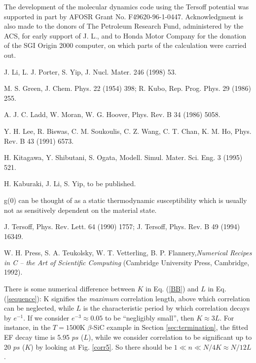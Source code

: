 \acknowledgments The development of the molecular dynamics code using
the Tersoff potential was supported in part by AFOSR Grant No.
F49620-96-1-0447.  Acknowledgment is also made to the donors of The
Petroleum Research Fund, administered by the ACS, for early support of
J. L., and to Honda Motor Company for the donation of the SGI Origin
2000 computer, on which parts of the calculation were carried out.

\begin{references}

 J. Li, L. J. Porter, S. Yip, J. Nucl. Mater. 246 (1998)
  53.

 M. S. Green, J. Chem. Phys. 22 (1954) 398; R.
  Kubo, Rep. Prog. Phys. 29 (1986) 255.
  
 A. J. C. Ladd, W. Moran, W. G. Hoover, Phys. Rev. B 34
  (1986) 5058.
 
 Y. H. Lee, R. Biswas, C. M. Soukoulis, C. Z. Wang, C. T.
  Chan, K. M. Ho, Phys. Rev. B 43 (1991) 6573.
 
 H. Kitagawa, Y. Shibutani, S. Ogata, Modell. Simul.
  Mater. Sci. Eng. 3 (1995) 521.
 
 H. Kaburaki, J. Li, S. Yip, to be published.
  
 \underline{\underline{g}}(0) can be thought of as
  a static thermodynamic susceptibility which is usually not as
  sensitively dependent on the material state.
 
 J.  Tersoff, Phys. Rev. Lett. 64 (1990) 1757; J.
  Tersoff, Phys. Rev. B 49 (1994) 16349.
 
 W. H. Press, S. A. Teukolsky, W. T. Vetterling, B. P.
  Flannery,{\em Numerical Recipes in C -- the Art of Scientific
    Computing} (Cambridge University Press, Cambridge, 1992).
 
 There is some numerical difference between
  $K$ in Eq. (\ref{BB}) and $L$ in Eq. (\ref{sequence}): K signifies
  the {\em maximum} correlation length, above which correlation can be
  neglected, while $L$ is the characteristic period by which
  correlation decays by $e^{-1}$.  If we consider $e^{-3} \approx
  0.05$ to be ``negligibly small'', then $K \approx 3L$. For instance,
  in the $T=1500$K $\beta$-SiC example in Section
  \ref{sec:termination}, the fitted EF decay time is 5.95 $ps$ ($L$),
  while we consider correlation to be significant up to 20 $ps$ ($K$)
  by looking at Fig.  \ref{corr5}.  So there should be $1 \ll n \ll
  N/4K \approx N/12L$.
  
\end{references}

